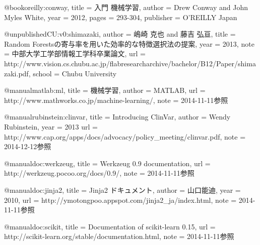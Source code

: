 @book{oreilly:conway,
	title     = {入門 機械学習},
	author    = {Drew Conway and John Myles White},
	year      = {2012},
	pages     = {293-304},
	publisher = {O'REILLY Japan}
}

@unpublished{CU:v0:shimazaki,
	author  = {嶋崎 克也 and 藤吉 弘亘},
	title   = {Random Forestsの寄与率を用いた効率的な特徴選択法の提案},
	year    = {2013},
	note    = {中部大学工学部情報工学科卒業論文},
	url     = {http://www.vision.cs.chubu.ac.jp/flabresearcharchive/bachelor/B12/Paper/shimazaki.pdf},
	school  = {Chubu University}
}

@manual{matlab:ml,
	title  = {機械学習},
	author = {MATLAB},
	url    = {http://www.mathworks.co.jp/machine-learning/},
	note   = {2014-11-11参照}
}

@manual{rubinstein:clinvar,
	title  = {Introducing ClinVar},
	author = {Wendy Rubinstein},
	year   = {2013}
	url    = {http://www.cap.org/apps/docs/advocacy/policy\_meeting/clinvar.pdf},
	note   = {2014-12-12参照}
}

@manual{doc:werkzeug,
	title  = {Werkzeug 0.9 documentation},
	url    = {http://werkzeug.pocoo.org/docs/0.9/},
	note   = {2014-11-11参照}
}

@manual{doc:jinja2,
	title  = {Jinja2 ドキュメント},
	author = {山口能迪},
	year   = {2010},
	url    = {http://ymotongpoo.appspot.com/jinja2\_ja/index.html},
	note   = {2014-11-11参照}
}

@manual{doc:scikit,
	title  = {Documentation of scikit-learn 0.15},
	url    = {http://scikit-learn.org/stable/documentation.html},
	note   = {2014-11-11参照}
}